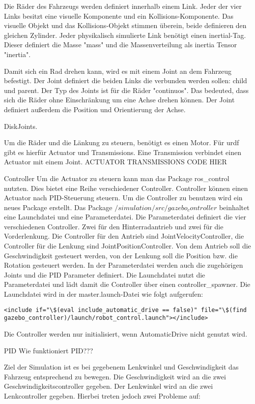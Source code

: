 Die Räder des Fahrzeugs werden definiert innerhalb einem Link.
Jeder der vier Links besitzt eine visuelle Komponente und ein Kollisions-Komponente.
Das visuelle Objekt und das Kollisions-Objekt stimmen überein, beide definieren den gleichen Zylinder.
Jeder physikalisch simulierte Link benötigt einen inertial-Tag.
Dieser definiert die Masse "mass" und die Massenverteilung als inertia Tensor "inertia".

Damit sich ein Rad drehen kann, wird es mit einem Joint an dem Fahrzeug befestigt.
Der Joint definiert die beiden Links die verbunden werden sollen: child und parent.
Der Typ des Joints ist für die Räder "continuos". Das bedeuted, dass sich die Räder ohne Einschränkung um eine Achse drehen können.
Der Joint definiert außerdem die Position und Orientierung der Achse.

DiskJoints.

Um die Räder und die Länkung zu steuern, benötigt es einen Motor. 
Für urdf gibt es hierfür Actuator und Transmissions.
Eine Transmission verbindet einen Actuator mit einem Joint. 
ACTUATOR TRANSMISSIONS CODE HIER

Controller
Um die Actuator zu steuern kann man das Package ros\_control nutzten.
Dies bietet eine Reihe verschiedener Controller.
Controller können einen Actuator nach PID-Steuerung steuern.
Um die Controller zu benutzen wird ein neues Package erstellt.
Das Package $/simulation/src/gazebo_controller$ beinhaltet eine Launchdatei und eine Parameterdatei.
Die Parameterdatei definiert die vier verschiedenen Controller.
Zwei für den Hinterradantrieb und zwei für die Vorderlenkung.
Die Controller für den Antrieb sind JointVelocityController, die Controller für die Lenkung sind JointPositionController.
Von dem Antrieb soll die Geschwindigkeit gesteuert werden, von der Lenkung soll die Position bzw. die Rotation gesteuert werden.
In der Parameterdatei werden auch die zugehörigen Joints und die PID Parameter definiert.
Die Launchdatei nutzt die Parameterdatei und lädt damit die Controller über einen controller\_spawner.
Die Launchdatei wird in der master.launch-Datei wie folgt aufgerufen:
\begin{lstlisting}
<include if="\$(eval include_automatic_drive == false)" file="\$(find gazebo_controller)/launch/robot_control.launch"></include>
\end{lstlisting}
Die Controller werden nur initialisiert, wenn AutomaticDrive nicht genutzt wird.

PID 
Wie funktioniert PID???

Ziel der Simulation ist es bei gegebenem Lenkwinkel und Geschwindigkeit das Fahrzeug entsprechend zu bewegen.
Die Geschwindigkeit wird an die zwei Geschwindigkeitscontroller gegeben.
Der Lenkwinkel wird an die zwei Lenkcontroller gegeben.
Hierbei treten jedoch zwei Probleme auf:

